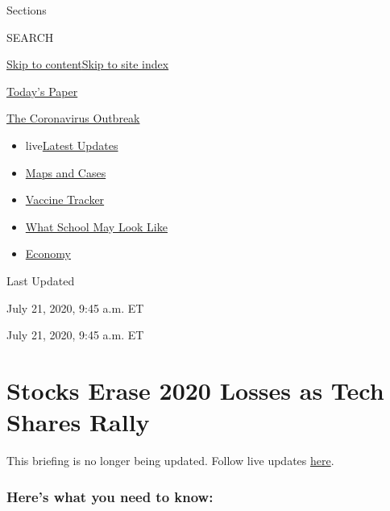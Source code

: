 Sections

SEARCH

\protect\hyperlink{site-content}{Skip to
content}\protect\hyperlink{site-index}{Skip to site index}

\href{https://myaccount.nytimes.com/auth/login?response_type=cookie\&client_id=vi}{}

\href{https://www.nytimes.com/section/todayspaper}{Today's Paper}

\href{https://www.nytimes.com/news-event/coronavirus}{The Coronavirus
Outbreak}

\begin{itemize}
\tightlist
\item
  live\href{https://www.nytimes.com/2020/08/01/world/coronavirus-covid-19.html}{Latest
  Updates}
\item
  \href{https://www.nytimes.com/interactive/2020/us/coronavirus-us-cases.html}{Maps
  and Cases}
\item
  \href{https://www.nytimes.com/interactive/2020/science/coronavirus-vaccine-tracker.html}{Vaccine
  Tracker}
\item
  \href{https://www.nytimes.com/interactive/2020/07/29/us/schools-reopening-coronavirus.html}{What
  School May Look Like}
\item
  \href{https://www.nytimes.com/live/2020/07/31/business/stock-market-today-coronavirus}{Economy}
\end{itemize}

Last Updated

July 21, 2020, 9:45 a.m. ET

July 21, 2020, 9:45 a.m. ET

\hypertarget{stocks-erase-2020-losses-as-tech-shares-rally}{%
\section{Stocks Erase 2020 Losses as Tech Shares
Rally}\label{stocks-erase-2020-losses-as-tech-shares-rally}}

This briefing is no longer being updated. Follow live updates
\href{https://www.nytimes.com/live/2020/07/21/business/stock-market-today-coronavirus}{here}.

\hypertarget{heres-what-you-need-to-know}{%
\subsubsection{Here's what you need to
know:}\label{heres-what-you-need-to-know}}

